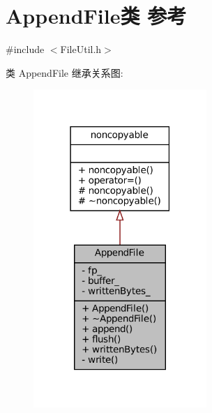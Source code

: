 \hypertarget{classmuduo_1_1FileUtil_1_1AppendFile}{}\section{Append\+File类 参考}
\label{classmuduo_1_1FileUtil_1_1AppendFile}


{\ttfamily \#include $<$File\+Util.\+h$>$}



类 Append\+File 继承关系图\+:
\nopagebreak
\begin{figure}[H]
\begin{center}
\leavevmode
\includegraphics[width=186pt]{classmuduo_1_1FileUtil_1_1AppendFile__inherit__graph}
\end{center}
\end{figure}


